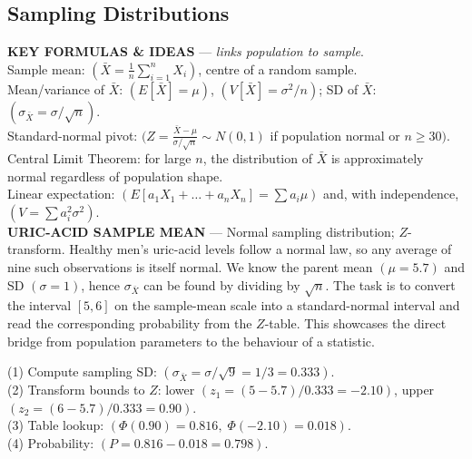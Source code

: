 \documentclass[landscape,0.4pt]{article}
\begin{document}
\begin{multicols*}{6}
\section*{\small{Sampling Distributions}}

\textbf{\tiny{KEY FORMULAS \& IDEAS}} — \textit{links population to sample}.\\
Sample mean: $(\bar{X}=\tfrac1n\sum_{i=1}^n X_i)$, centre of a random sample.\\
Mean/variance of $\bar{X}$: $(E[\bar{X}]=\mu)$, $(V[\bar{X}]=\sigma^{2}/n)$; SD of $\bar{X}$: $(\sigma_{\bar{X}}=\sigma/\sqrt{n})$.\\
Standard-normal pivot: $(Z=\tfrac{\bar{X}-\mu}{\sigma/\sqrt{n}}\sim N(0,1)$ if population normal or $n\ge30)$.\\
Central Limit Theorem: for large $n$, the distribution of $\bar{X}$ is approximately normal regardless of population shape.\\
Linear expectation: $(E[a_1X_1+\dots+a_nX_n]=\sum a_i\mu)$ and, with independence, $(V=\sum a_i^{2}\sigma^{2})$.\\[-2pt]


\textbf{\tiny{URIC-ACID SAMPLE MEAN}} — Normal sampling distribution; $Z$-transform.  
Healthy men’s uric-acid levels follow a normal law, so any average of nine such observations is itself normal.  
We know the parent mean $(\mu=5.7)$ and SD $(\sigma=1)$, hence $\sigma_{\bar{X}}$ can be found by dividing by $\sqrt{n}$.  
The task is to convert the interval $[5,6]$ on the sample-mean scale into a standard-normal interval and read the corresponding probability from the $Z$-table.  
This showcases the direct bridge from population parameters to the behaviour of a statistic.

(1) Compute sampling SD: $(\sigma_{\bar{X}}=\sigma/\sqrt{9}=1/3=0.333)$.\\
(2) Transform bounds to $Z$: lower $(z_1=(5-5.7)/0.333=-2.10)$, upper $(z_2=(6-5.7)/0.333=0.90)$.\\
(3) Table lookup: $(\Phi(0.90)=0.816,\;\Phi(-2.10)=0.018)$.\\
(4) Probability: $(P=0.816-0.018=0.798)$.\\[-2pt]


\end{multicols*}
\end{document}
